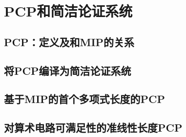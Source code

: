 \chapter{PCP和简洁论证系统}\label{chp:09PCP}

\section{PCP：定义及和MIP的关系}\label{9.1}
\section{将PCP编译为简洁论证系统}\label{9.2}
\section{基于MIP的首个多项式长度的PCP}\label{9.3}
\section{对算术电路可满足性的准线性长度PCP}\label{9.4}